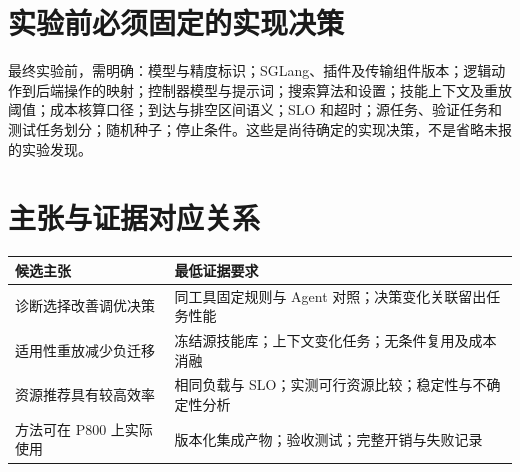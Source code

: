 \documentclass[UTF8,11pt,a4paper,fontset=windows]{ctexart}
\begin{document}
\appendix
\section{实验前必须固定的实现决策}
最终实验前，需明确：模型与精度标识；SGLang、插件及传输组件版本；逻辑动作到后端操作的映射；控制器模型与提示词；搜索算法和设置；技能上下文及重放阈值；成本核算口径；到达与排空区间语义；SLO 和超时；源任务、验证任务和测试任务划分；随机种子；停止条件。这些是尚待确定的实现决策，不是省略未报的实验发现。

\section{主张与证据对应关系}
\noindent\begin{tabularx}{\linewidth}{@{}YY@{}}
\toprule
候选主张 & 最低证据要求 \\
\midrule
诊断选择改善调优决策 & 同工具固定规则与 Agent 对照；决策变化关联留出任务性能 \\
适用性重放减少负迁移 & 冻结源技能库；上下文变化任务；无条件复用及成本消融 \\
资源推荐具有较高效率 & 相同负载与 SLO；实测可行资源比较；稳定性与不确定性分析 \\
方法可在 P800 上实际使用 & 版本化集成产物；验收测试；完整开销与失败记录 \\
\bottomrule
\end{tabularx}

{\small
\setlength{\bibsep}{5pt plus 1pt minus 1pt}


}
\end{document}
